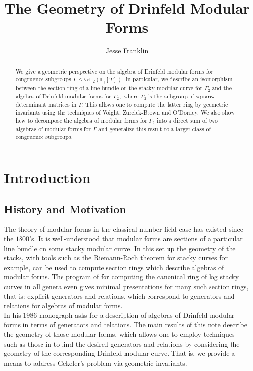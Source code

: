 \documentclass[11pt]{amsart}
\theoremstyle{definition}
\numberwithin{equation}{section}
\newcommand{\GL}{\mathrm{GL}} 	%
\newcommand{\bbF}{\mathbb{F}}		%
\begin{document}
	
\title{The Geometry of Drinfeld Modular Forms}
\author{Jesse Franklin}
	
	\begin{abstract}
			We give a geometric perspective on the algebra of Drinfeld modular forms for congruence subgroups $\Gamma\leq \GL_2(\bbF_q[T]).$ In particular, we describe an isomorphism between the section ring of a line bundle on the stacky modular curve for $\Gamma_2$ and the algebra of Drinfeld modular forms for $\Gamma_2,$ where $\Gamma_2$ is the subgroup of square-determinant matrices in $\Gamma.$ This allows one to compute the latter ring by geometric invariants using the techniques of Voight, Zureick-Brown and O'Dorney. We also show how to decompose the algebra of modular forms for $\Gamma_2$ into a direct sum of two algebras of modular forms for $\Gamma$ and generalize this result to a larger class of congruence subgroups. 
		\end{abstract}
		\maketitle
		\tableofcontents
		
		\section{Introduction}
		
		\subsection{History and Motivation}
		The theory of modular forms in the classical number-field case has existed since the $1800$'s. It is well-understood that modular forms are sections of a particular line bundle on some stacky modular curve. In this set up the geometry of the stacks, with tools such as the Riemann-Roch theorem for stacky curves for example, can be used to compute section rings which describe algebras of modular forms. The program of \cite{VZB} for computing the canonical ring of log stacky curves in all genera even gives minimal presentations for many such section rings, that is: explicit generators and relations, which correspond to generators and relations for algebras of modular forms.\\
		
		In his $1986$ monograph \cite[Page $\mathrm{XIII}$]{Gekeler-Curves} asks for a description of algebras of Drinfeld modular forms in terms of generators and relations. The main results of this note describe the geometry of those modular forms, which allows one to employ techniques such as those in \cite{VZB} to find the desired generators and relations by considering the geometry of the corresponding Drinfeld modular curve. That is, we provide a means to address Gekeler's problem via geometric invariants.\\
		
\end{document}

